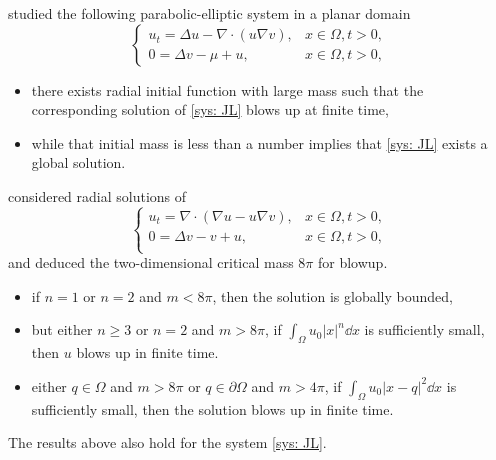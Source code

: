 \begin{frame}
 studied the following parabolic-elliptic system in a planar domain   
\begin{equation}\label{sys: JL}
\begin{cases}\tag{JL}
u_t = \Delta u - \nabla\cdot(u\nabla v), & x\in\Omega, t > 0,\\
0 = \Delta v - \mu + u, & x\in\Omega, t > 0,
\end{cases}
\end{equation}
\begin{itemize}
    \item there exists radial initial function with large mass such that the corresponding solution of \eqref{sys: JL} blows up at finite time, 
    \item while that initial mass is less than a number implies that \eqref{sys: JL} exists a global solution.
\end{itemize}
\end{frame}

\begin{frame}
       considered radial solutions of
 \begin{equation}
 \label{sys: nagai pe}
 \begin{cases}\tag{N}
 u_t = \nabla\cdot(\nabla u - u\nabla v), & x\in\Omega, t > 0,\\
 0 = \Delta v - v + u, & x\in\Omega, t > 0, \\
 \end{cases}
 \end{equation} 
 and deduced the two-dimensional critical mass $8\pi$ for blowup.
 \begin{itemize}
    \item if $n=1$ or $n=2$ and $m<8\pi$, then the solution is globally bounded, 
    \item but either $n\geq3$ or $n=2$ and $m>8\pi$, if $\int_\Omega u_0|x|^n\dd x$ is sufficiently small, then $u$ blows up in finite time.
    \item either $q\in\Omega$ and $m > 8\pi$ or $q\in\partial\Omega$ and $m > 4\pi$, if $\int_\Omega u_0|x-q|^2\dd x$ is sufficiently small, then the solution blows up in finite time. 
 \end{itemize}
 The results above also hold for the system \eqref{sys: JL}.
\end{frame}


